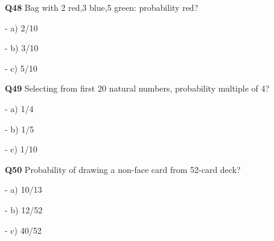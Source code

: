 \textbf{Q48} Bag with 2 red,3 blue,5 green: probability red?\par
\quad - a) 2/10\par
\quad - b) 3/10\par
\quad - c) 5/10\par

\textbf{Q49} Selecting from first 20 natural numbers, probability multiple of 4?\par
\quad - a) 1/4\par
\quad - b) 1/5\par
\quad - c) 1/10\par

\textbf{Q50} Probability of drawing a non-face card from 52-card deck?\par
\quad - a) 10/13\par
\quad - b) 12/52\par
\quad - c) 40/52\par